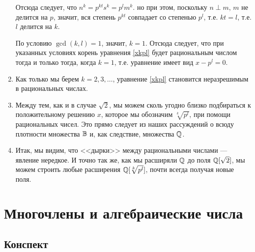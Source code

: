 \begin{enumerate}
Отсюда следует, что $n^k=p^{kt}s^k=p^lm^k$. но при этом, поскольку $n\perp m$, $m$ не делится на $p$, значит, вся степень $p^{kt}$ совпадает со степенью $p^l$, т.е. $kt=l$, т.е. $l$ делится на $k$.

По условию $\gcd(k,l)=1$, значит, $k=1$. Отсюда следует, что при указанных условиях корень уравнения \eqref{xkpl} будет рациональным числом тогда и только тогда, когда $k=1$, т.е. уравнение имеет вид $x-p^l=0$.
\item Как только мы берем $k=2,3,\dots$, уравнение \eqref{xkpl} становится неразрешимым в рациональных числах.
\item Между тем, как и в случае $\sqrt 2$, мы можем сколь угодно близко подбираться к положительному решению $x$, которое мы обозначим $\sqrt[k]{p^l}$, при помощи рациональных чисел. Это прямо следует из наших рассуждений о всюду плотности множества $\mathbb B$ и, как следствие, множества $\mathbb Q$.
\item Итак, мы видим, что <<дырки>> между рациональными числами --- явление нередкое. И точно так же, как мы расширяли $\mathbb Q$ до поля $\mathbb Q[\sqrt 2]$, мы можем строить любые расширения $\mathbb Q[\sqrt[k]{p^l}]$, почти всегда получая новые поля.

\end{enumerate}



\section{Многочлены и алгебраические числа}

\subsection*{Конспект}

